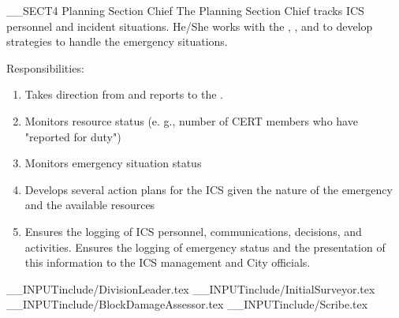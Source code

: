 __SECT4{ \Large Planning Section Chief
\label{sec:PlanningSectionChief} }
The Planning Section Chief tracks ICS personnel and incident situations.
He/She works with the \IncidentCommander, 
\OperationsSectionChief, and 
\LogisticsSectionChief to develop strategies 
to handle the emergency situations.

Responsibilities:
\begin{enumerate}
\item Takes direction from and reports to the \IncidentCommander.
\item Monitors resource status (e. g., number of CERT members who have "reported for duty")
\item Monitors emergency situation status
\item Develops several action plans for the ICS given the nature of the emergency and the available resources
\item Ensures the logging of ICS personnel, communications, decisions, and activities.  Ensures the logging of emergency status and the presentation of this information to the ICS management and City officials.
\end{enumerate}


__INPUT{include/DivisionLeader.tex}
__INPUT{include/InitialSurveyor.tex}
__INPUT{include/BlockDamageAssessor.tex}
__INPUT{include/Scribe.tex}

